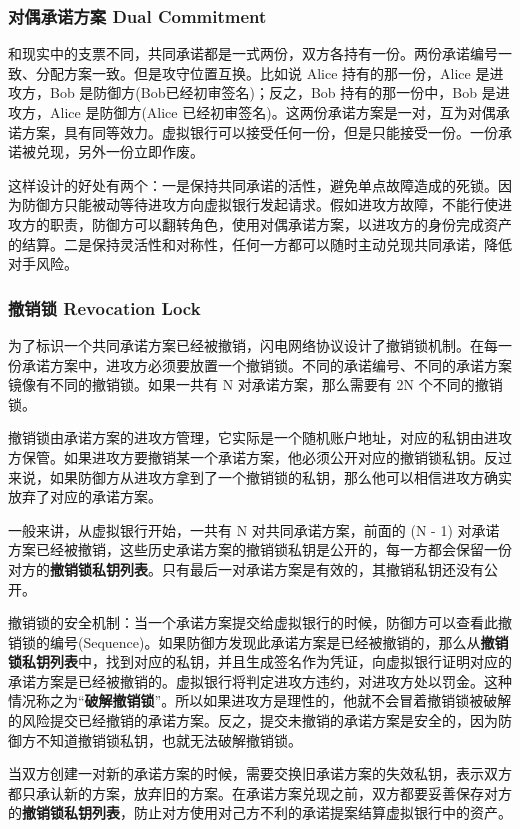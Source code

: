 \subsubsection{对偶承诺方案 Dual Commitment}
和现实中的支票不同，共同承诺都是一式两份，双方各持有一份。两份承诺编号一致、分配方案一致。但是攻守位置互换。比如说 Alice 持有的那一份，Alice 是进攻方，Bob 是防御方(Bob已经初审签名)；反之，Bob 持有的那一份中，Bob 是进攻方，Alice 是防御方(Alice 已经初审签名)。这两份承诺方案是一对，互为对偶承诺方案，具有同等效力。虚拟银行可以接受任何一份，但是只能接受一份。一份承诺被兑现，另外一份立即作废。

这样设计的好处有两个：一是保持共同承诺的活性，避免单点故障造成的死锁。因为防御方只能被动等待进攻方向虚拟银行发起请求。假如进攻方故障，不能行使进攻方的职责，防御方可以翻转角色，使用对偶承诺方案，以进攻方的身份完成资产的结算。二是保持灵活性和对称性，任何一方都可以随时主动兑现共同承诺，降低对手风险。

\subsubsection{撤销锁 Revocation Lock}
为了标识一个共同承诺方案已经被撤销，闪电网络协议设计了撤销锁机制。在每一份承诺方案中，进攻方必须要放置一个撤销锁。不同的承诺编号、不同的承诺方案镜像有不同的撤销锁。如果一共有 N 对承诺方案，那么需要有 2N 个不同的撤销锁。

撤销锁由承诺方案的进攻方管理，它实际是一个随机账户地址，对应的私钥由进攻方保管。如果进攻方要撤销某一个承诺方案，他必须公开对应的撤销锁私钥。反过来说，如果防御方从进攻方拿到了一个撤销锁的私钥，那么他可以相信进攻方确实放弃了对应的承诺方案。 

一般来讲，从虚拟银行开始，一共有 N 对共同承诺方案，前面的 (N - 1) 对承诺方案已经被撤销，这些历史承诺方案的撤销锁私钥是公开的，每一方都会保留一份对方的\textbf{撤销锁私钥列表}。只有最后一对承诺方案是有效的，其撤销私钥还没有公开。

撤销锁的安全机制：当一个承诺方案提交给虚拟银行的时候，防御方可以查看此撤销锁的编号(Sequence)。如果防御方发现此承诺方案是已经被撤销的，那么从\textbf{撤销锁私钥列表}中，找到对应的私钥，并且生成签名作为凭证，向虚拟银行证明对应的承诺方案是已经被撤销的。虚拟银行将判定进攻方违约，对进攻方处以罚金。这种情况称之为“\textbf{破解撤销锁}”。所以如果进攻方是理性的，他就不会冒着撤销锁被破解的风险提交已经撤销的承诺方案。反之，提交未撤销的承诺方案是安全的，因为防御方不知道撤销锁私钥，也就无法破解撤销锁。

当双方创建一对新的承诺方案的时候，需要交换旧承诺方案的失效私钥，表示双方都只承认新的方案，放弃旧的方案。在承诺方案兑现之前，双方都要妥善保存对方的\textbf{撤销锁私钥列表}，防止对方使用对己方不利的承诺提案结算虚拟银行中的资产。

